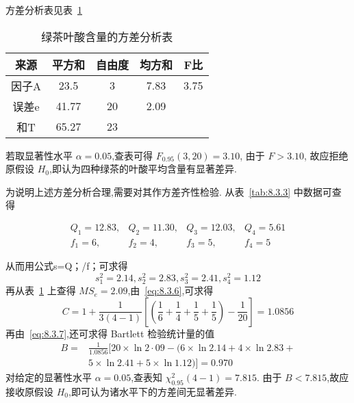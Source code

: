 \begin{example}
方差分析表见表~\ref{tab:8.3.4}

\begin{table}[htbp]
  \centering
  \caption{绿茶叶酸含量的方差分析表}
    \begin{tabular}{ccccc}
    \toprule
    来源    & 平方和   & 自由度   & 均方和   & F比 \\
    \midrule
    因子A   & 23.5  & 3     & 7.83  & 3.75 \\
    误差e   & 41.77 & 20    & 2.09  &  \\
    \midrule
    和T    & 65.27 & 23    &       &  \\
    \bottomrule
    \end{tabular}%
  \label{tab:8.3.4}%
\end{table}%
若取显著性水平 $\alpha=0.05$,查表可得 $F_{0.95}(3,20) = 3.10$, 由于 $F > 3.10$, 故应拒绝原假设 $H_0$,即认为四种绿茶的叶酸平均含量有显著差异.

为说明上述方差分析合理,需要对其作方差齐性检验. 从表~\ref{tab:8.3.3} 中数据可查得

\begin{equation*}
\begin{array}{llll}{Q_{1}=12.83,} & {Q_{2}=11.30,} & {Q_{3}=12.03,} & {Q_{4}=5.61} \\ {f_{1}=6,} & {f_{2}=4,} & {f_{3}=5,} & {f_{4}=5}\end{array}
\end{equation*}

从而用公式s=Q；/f；可求得
\begin{equation*}
  s_{1}^{2}=2.14, s_{2}^{2}=2.83, s_{3}^{2}=2.41, s_{4}^{2}=1.12
\end{equation*}
再从表~\ref{tab:8.3.4} 上查得 $MS_{e}=2.09$,由~\eqref{eq:8.3.6},可求得
\begin{equation*}
  C=1+\frac{1}{3(4-1)}\left[\left(\frac{1}{6}+\frac{1}{4}+\frac{1}{5}+\frac{1}{5}\right)-\frac{1}{20}\right]=1.0856
\end{equation*}
再由~\eqref{eq:8.3.7},还可求得 Bartlett 检验统计量的值
\begin{equation*}
\begin{aligned} B=& \frac{1}{1.0856}[20 \times \ln 2 \cdot 09-(6 \times \ln 2.14+4 \times \ln 2.83+\\ & 5 \times \ln 2.41+5 \times \ln 1.12 ) ]=0.970
\end{aligned}
\end{equation*}
对给定的显著性水平 $\alpha=0.05$,查表知 $\chi^2_{0.95}(4-1)=7.815$. 由于 $B<7.815$,故应接收原假设 $H_0$,即可认为诸水平下的方差间无显著差异.
\end{example}

